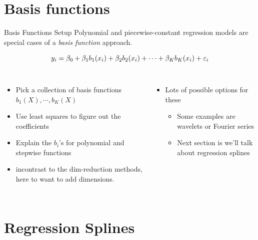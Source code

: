 \documentclass[aspectratio=169,usenames,dvipsnames]{beamer}
\newcommand{\InstructorList}[1]{
\begin{itemize}
	\color{orange}
	#1
\end{itemize}
}
\begin{document}
\section{Basis functions}


\begin{frame}[t]{Basis Functions Setup}
Polynomial and piecewise-constant regression models are special cases of a \textit{basis function} approach.

\begin{equation*}
	y_i = \beta_0 + \beta_1b_1(x_i) + \beta_2 b_2(x_i) + \cdots + \beta_K b_K(x_i) + \varepsilon_i
\end{equation*}

\begin{columns}
\centering
\InstructorList{
  \item Pick a collection of basis functions $b_1(X),\cdots,b_K(X)$
	\item Use least squares to figure out the coefficients
	\item Explain the $b_i$'s for polynomial and stepwise functions
	\item incontrast to the dim-reduction methods, here to want to add dimensions. 

}

\centering

\InstructorList{
	\item Lots of possible options for these
	\InstructorList{
	  \item Some examples are wavelets or Fourier series
		\item Next section is we'll talk about regression splines
	}
}


\end{columns}

\end{frame}


\section{Regression Splines}
\end{document}
